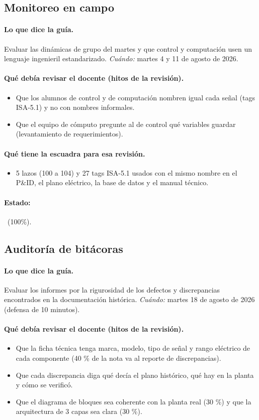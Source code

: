 \documentclass[a4paper,11pt]{article}
\begin{document}
\subsection{Monitoreo en campo}
\paragraph{Lo que dice la guía.} Evaluar las dinámicas de grupo del martes y que control y computación usen un lenguaje ingenieril estandarizado. \textit{Cuándo:} martes 4 y 11 de agosto de 2026.
\paragraph{Qué debía revisar el docente (hitos de la revisión).}
\begin{itemize}
\item[$\square$] Que los alumnos de control y de computación nombren igual cada señal (tags ISA-5.1) y no con nombres informales.
\item[$\square$] Que el equipo de cómputo pregunte al de control qué variables guardar (levantamiento de requerimientos).
\end{itemize}
\paragraph{Qué tiene la escuadra para esa revisión.}
\begin{itemize}
\item 5 lazos (100 a 104) y 27 tags ISA-5.1 usados con el mismo nombre en el P\&ID, el plano eléctrico, la base de datos y el manual técnico.
\end{itemize}
\paragraph{Estado:} \cumple~(100\%).
\subsection{Auditoría de bitácoras}
\paragraph{Lo que dice la guía.} Evaluar los informes por la rigurosidad de los defectos y discrepancias encontrados en la documentación histórica. \textit{Cuándo:} martes 18 de agosto de 2026 (defensa de 10 minutos).
\paragraph{Qué debía revisar el docente (hitos de la revisión).}
\begin{itemize}
\item[$\square$] Que la ficha técnica tenga marca, modelo, tipo de señal y rango eléctrico de cada componente (40 \% de la nota va al reporte de discrepancias).
\item[$\square$] Que cada discrepancia diga qué decía el plano histórico, qué hay en la planta y cómo se verificó.
\item[$\square$] Que el diagrama de bloques sea coherente con la planta real (30 \%) y que la arquitectura de 3 capas sea clara (30 \%).
\end{itemize}
\end{document}

